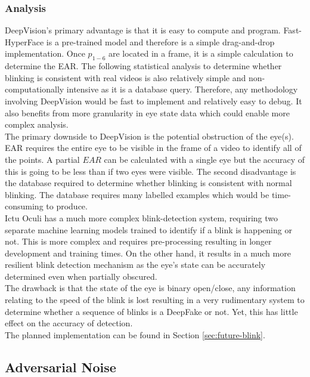 \documentclass{article}
\begin{document}
\subsubsection{Analysis}

DeepVision's primary advantage is that it is easy to compute and program. Fast-HyperFace is a pre-trained model and therefore is a simple drag-and-drop implementation. Once $p_{1-6}$ are located in a frame, it is a simple calculation to determine the EAR. The following statistical analysis to determine whether blinking is consistent with real videos is also relatively simple and non-computationally intensive as it is a database query. Therefore, any methodology involving DeepVision would be fast to implement and relatively easy to debug. It also benefits from more granularity in eye state data which could enable more complex analysis.\\

The primary downside to DeepVision is the potential obstruction of the eye(s). EAR requires the entire eye to be visible in the frame of a video to identify all of the points. A partial $EAR$ can be calculated with a single eye but the accuracy of this is going to be less than if two eyes were visible. The second disadvantage is the database required to determine whether blinking is consistent with normal blinking. The database requires many labelled examples which would be time-consuming to produce.\\

Ictu Oculi has a much more complex blink-detection system, requiring two separate machine learning models trained to identify if a blink is happening or not. This is more complex and requires pre-processing resulting in longer development and training times. On the other hand, it results in a much more resilient blink detection mechanism as the eye's state can be accurately determined even when partially obscured.\\

The drawback is that the state of the eye is binary open/close, any information relating to the speed of the blink is lost resulting in a very rudimentary system to determine whether a sequence of blinks is a DeepFake or not. Yet, this has little effect on the accuracy of detection.\\

The planned implementation can be found in Section \ref{sec:future-blink}.

\subsection{Adversarial Noise}
\end{document}
